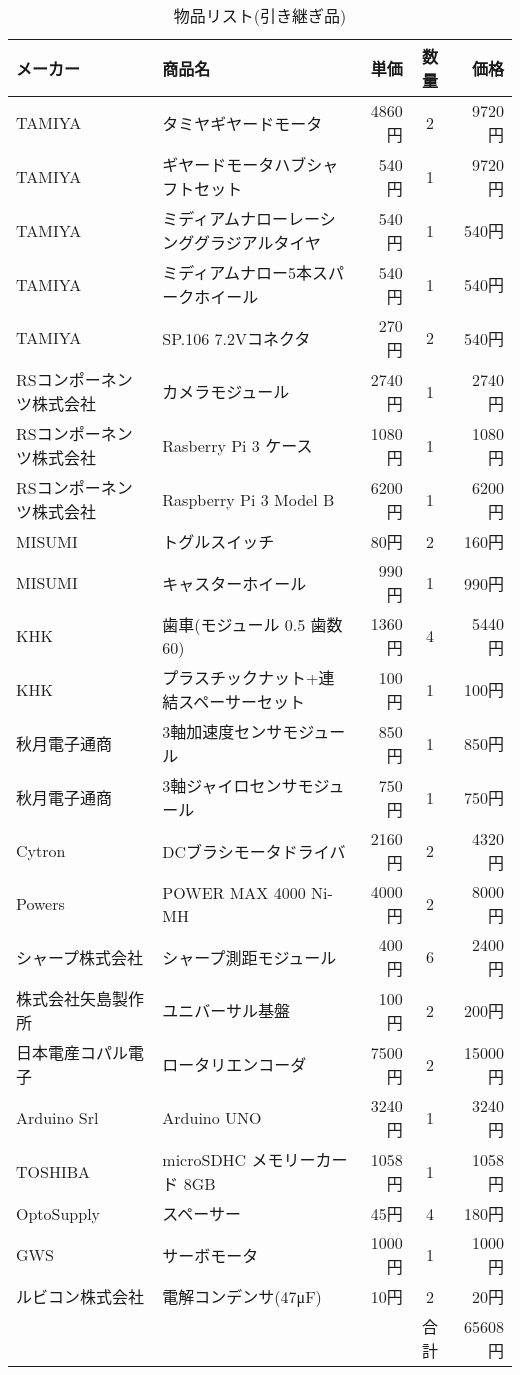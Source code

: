 \begin{table}[H]
\begin{center}
  \caption{物品リスト(引き継ぎ品)}
  \begin{tabular}{|l|l|r|c|r|}  \hline
   メーカー & 商品名 & 単価 & 数量 & 価格 \\ \hline \hline 
   TAMIYA & タミヤギヤードモータ & 4860円 & 2 & 9720円  \\     \hline
   TAMIYA & ギヤードモータハブシャフトセット & 540円 & 1 & 9720円   \\  \hline
   TAMIYA & ミディアムナローレーシンググラジアルタイヤ & 540円 & 1 & 540円  \\  \hline
   TAMIYA & ミディアムナロー5本スパークホイール & 540円 & 1 & 540円   \\     \hline
   TAMIYA & SP.106 7.2Vコネクタ & 270円 & 2 & 540円  \\      \hline
   RSコンポーネンツ株式会社 & カメラモジュール &  2740円 & 1 & 2740円  \\ \hline
   RSコンポーネンツ株式会社 & Rasberry Pi 3 ケース & 1080円 & 1 & 1080円  \\    \hline
   RSコンポーネンツ株式会社 & Raspberry Pi 3 Model B & 6200円 & 1 & 6200円  \\     \hline
   MISUMI & トグルスイッチ & 80円 & 2 & 160円 \\       \hline
   MISUMI & キャスターホイール & 990円 & 1 & 990円 \\     \hline
   KHK & 歯車(モジュール 0.5 歯数60) &1360円 & 4 & 5440円 \\      \hline
   KHK & プラスチックナット+連結スペーサーセット & 100円 & 1 & 100円  \\      \hline
   秋月電子通商 & 3軸加速度センサモジュール & 850円 & 1 & 850円  \\     \hline
   秋月電子通商 & 3軸ジャイロセンサモジュール & 750円  & 1 & 750円 \\     \hline
   Cytron &DCブラシモータドライバ & 2160円 & 2 & 4320円 \\       \hline
   Powers & POWER MAX 4000 Ni-MH& 4000円 & 2 & 8000円  \\     \hline
   シャープ株式会社 & シャープ測距モジュール & 400円 & 6 & 2400円  \\    \hline
   株式会社矢島製作所 & ユニバーサル基盤 & 100円 & 2 & 200円 \\    \hline
   日本電産コパル電子 & ロータリエンコーダ & 7500円 & 2 & 15000円  \\   \hline
   Arduino Srl & Arduino UNO & 3240円 & 1 & 3240円  \\     \hline
   TOSHIBA & microSDHC メモリーカード 8GB & 1058円 & 1 & 1058円  \\    \hline
   OptoSupply & スペーサー & 45円 & 4 & 180円  \\     \hline
   GWS &サーボモータ & 1000円 & 1 & 1000円  \\    \hline
   ルビコン株式会社 & 電解コンデンサ(47μF) & 10円 & 2 &20円 \\     \hline
 &  & &合計 & 65608円  \\   \hline
 \end{tabular}
\end{center}
\end{table}

